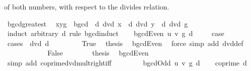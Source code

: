 \begin{isabellebody}
\begin{isamarkuptext}
 of both numbers, with respect to the divides relation.%
\end{isamarkuptext}\isamarkuptrue%
\isamarkupfalse%
\ bgcd{\isacharunderscore}{\kern0pt}greatest{\isacharcolon}{\kern0pt}\isanewline
\ \ {\isachardoublequoteopen}{\isacharparenleft}{\kern0pt}x{\isacharcomma}{\kern0pt}y{\isacharcomma}{\kern0pt}g{\isacharparenright}{\kern0pt}\ {\isasymin}\ bgcd\ {\isasymLongrightarrow}\ d\ dvd\ x\ {\isasymLongrightarrow}\ d\ dvd\ y\ {\isasymLongrightarrow}\ d\ dvd\ g{\isachardoublequoteclose}\isanewline
%
\isadelimproof
%
\endisadelimproof
%
\isatagproof
{}\isamarkupfalse%
\ {\isacharparenleft}{\kern0pt}induct\ arbitrary{\isacharcolon}{\kern0pt}\ d\ rule{\isacharcolon}{\kern0pt}\ bgcd{\isachardot}{\kern0pt}induct{\isacharparenright}{\kern0pt}\isanewline
\ \ \isamarkupfalse%
\ {\isacharparenleft}{\kern0pt}bgcdEven\ u\ v\ g\ d{\isacharparenright}{\kern0pt}\ \isanewline
\ \ \isamarkupfalse%
\ {\isacharquery}{\kern0pt}case\isanewline
\ \ \ \ \isamarkupfalse%
\ {\isacharparenleft}{\kern0pt}cases\ {\isachardoublequoteopen}{}\ dvd\ d{\isachardoublequoteclose}{\isacharparenright}{\kern0pt}\ \isanewline
\ \ \ \ \ \ \isamarkupfalse%
\ True\ \isamarkupfalse%
\ {\isacharquery}{\kern0pt}thesis\ \isamarkupfalse%
\ bgcdEven\ \isamarkupfalse%
\ {\isacharparenleft}{\kern0pt}force\ simp\ add{\isacharcolon}{\kern0pt}\ dvd{\isacharunderscore}{\kern0pt}def{\isacharparenright}{\kern0pt}\ \isanewline
\ \ \ \ \isamarkupfalse%
\isanewline
\ \ \ \ \ \ \isamarkupfalse%
\ False\isanewline
\ \ \ \ \ \ \isamarkupfalse%
\ {\isacharquery}{\kern0pt}thesis\ \isamarkupfalse%
\ bgcdEven\isanewline
\ \ \ \ \ \ \ \ \isamarkupfalse%
\ {\isacharparenleft}{\kern0pt}simp\ add{\isacharcolon}{\kern0pt}\ coprime{\isacharunderscore}{\kern0pt}dvd{\isacharunderscore}{\kern0pt}mult{\isacharunderscore}{\kern0pt}right{\isacharunderscore}{\kern0pt}iff{\isacharparenright}{\kern0pt}\isanewline
\ \ \ \ \isamarkupfalse%
\isanewline
{}\isamarkupfalse%
\isanewline
\ \ \isamarkupfalse%
\ {\isacharparenleft}{\kern0pt}bgcdOdd\ u\ v\ g\ d{\isacharparenright}{\kern0pt}\isanewline
\ \ \isamarkupfalse%
\ {\isachardoublequoteopen}coprime\ d\ {}{\isachardoublequoteclose}\isanewline
\ \ \ \ \isamarkupfalse%

\end{isabellebody}

